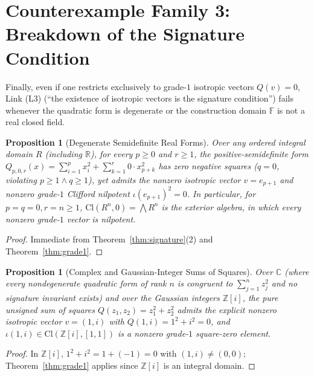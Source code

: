 \documentclass[11pt]{article}
\newtheorem{proposition}[theorem]{Proposition}
\theoremstyle{definition}
\newcommand{\Cl}{\mathrm{Cl}}
\newcommand{\F}{\mathbb{F}}
\newcommand{\R}{\mathbb{R}}
\newcommand{\Z}{\mathbb{Z}}
\newcommand{\C}{\mathbb{C}}
\begin{document}
\section{Counterexample Family 3: Breakdown of the Signature Condition}

Finally, even if one restricts exclusively to grade-$1$ isotropic vectors $Q(v) = 0$,
Link (L3) (``the existence of isotropic vectors is the signature condition'') fails
whenever the quadratic form is degenerate or the construction domain $\F$ is not a real
closed field.

\begin{proposition}[Degenerate Semidefinite Real Forms]\label{prop:degenerate}
Over any ordered integral domain $R$ (including $\R$), for every $p \ge 0$ and $r \ge 1$,
the positive-semidefinite form $Q_{p,0,r}(x) = \sum_{i=1}^p x_i^2 + \sum_{k=1}^r 0 \cdot x_{p+k}^2$
has zero negative squares ($q = 0$, violating $p \ge 1 \land q \ge 1$), yet admits the
nonzero isotropic vector $v = e_{p+1}$ and nonzero grade-$1$ Clifford nilpotent
$\iota(e_{p+1})^2 = 0$. In particular, for $p = q = 0, r = n \ge 1$, $\Cl(R^n, 0) = \bigwedge R^n$
is the exterior algebra, in which every nonzero grade-$1$ vector is nilpotent.
\end{proposition}
\begin{proof}
Immediate from Theorem~\ref{thm:signature}(2) and Theorem~\ref{thm:grade1}.
\end{proof}

\begin{proposition}[Complex and Gaussian-Integer Sums of Squares]\label{prop:complex}
Over $\C$ (where every nondegenerate quadratic form of rank $n$ is congruent to
$\sum_{j=1}^n z_j^2$ and no signature invariant exists) and over the Gaussian integers
$\Z[i]$, the pure unsigned sum of squares $Q(z_1, z_2) = z_1^2 + z_2^2$ admits the
explicit nonzero isotropic vector $v = (1, i)$ with $Q(1, i) = 1^2 + i^2 = 0$, and
$\iota(1, i) \in \Cl(\Z[i], [1, 1])$ is a nonzero grade-$1$ square-zero element.
\end{proposition}
\begin{proof}
In $\Z[i]$, $1^2 + i^2 = 1 + (-1) = 0$ with $(1, i) \ne (0, 0)$; Theorem~\ref{thm:grade1}
applies since $\Z[i]$ is an integral domain.
\end{proof}
\end{document}
